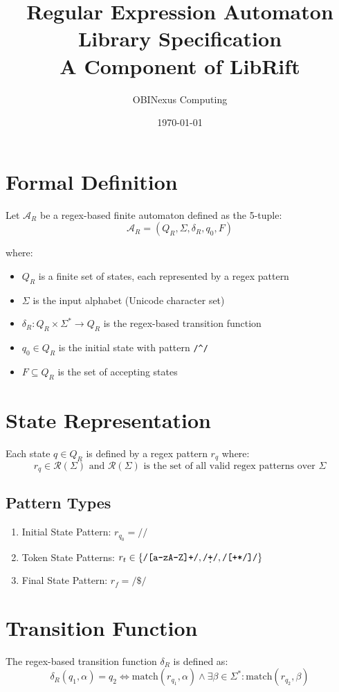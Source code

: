 \documentclass{article}
\title{Regular Expression Automaton Library Specification\\
\large A Component of LibRift}
\author{OBINexus Computing}
\date{\today}
\newcommand{\regex}[1]{\texttt{/#1/}}
\begin{document}
\maketitle

\section{Formal Definition}
Let $\mathcal{A}_R$ be a regex-based finite automaton defined as the 5-tuple:
\[
\mathcal{A}_R = (Q_R, \Sigma, \delta_R, q_0, F)
\]

where:
\begin{itemize}
\item $Q_R$ is a finite set of states, each represented by a regex pattern
\item $\Sigma$ is the input alphabet (Unicode character set)
\item $\delta_R: Q_R \times \Sigma^* \rightarrow Q_R$ is the regex-based transition function
\item $q_0 \in Q_R$ is the initial state with pattern \regex{\^{}}
\item $F \subseteq Q_R$ is the set of accepting states
\end{itemize}

\section{State Representation}
Each state $q \in Q_R$ is defined by a regex pattern $r_q$ where:
\[
r_q \in \mathcal{R}(\Sigma) \text{ and } \mathcal{R}(\Sigma) \text{ is the set of all valid regex patterns over } \Sigma
\]

\subsection{Pattern Types}
\begin{enumerate}
\item Initial State Pattern: $r_{q_0} = \regex{\^{}}$ 
\item Token State Patterns: $r_t \in \{\regex{[a-zA-Z]+}, \regex{\d+}, \regex{[+\-*/]}\}$
\item Final State Pattern: $r_f = \regex{\$}$
\end{enumerate}

\section{Transition Function}
The regex-based transition function $\delta_R$ is defined as:
\[
\delta_R(q_1, \alpha) = q_2 \iff \text{match}(r_{q_1}, \alpha) \land \exists \beta \in \Sigma^*: \text{match}(r_{q_2}, \beta)
\]
\end{document}
